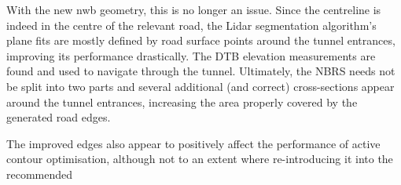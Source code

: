 With the new \ac{nwb} geometry, this is no longer an issue. Since the centreline is indeed in the centre of the relevant road, the Lidar segmentation algorithm's plane fits are mostly defined by road surface points around the tunnel entrances, improving its performance drastically. The DTB elevation measurements are found and used to navigate through the tunnel. Ultimately, the NBRS needs not be split into two parts and several additional (and correct) cross-sections appear around the tunnel entrances, increasing the area properly covered by the generated road edges.

The improved edges also appear to positively affect the performance of active contour optimisation, although not to an extent where re-introducing it into the recommended 